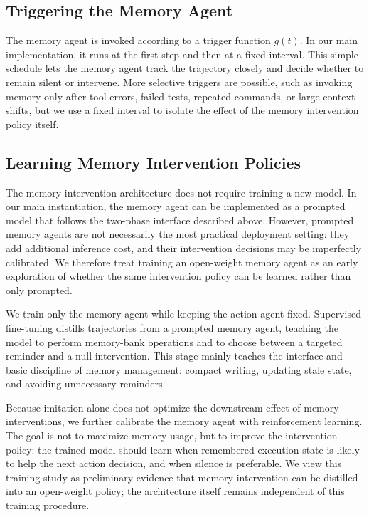 \subsection{Triggering the Memory Agent}

The memory agent is invoked according to a trigger function $g(t)$. In our main
implementation, it runs at the first step and then at a fixed interval. This
simple schedule lets the memory agent track the trajectory closely and decide
whether to remain silent or intervene. More selective triggers are possible, such
as invoking memory only after tool errors, failed tests, repeated commands, or
large context shifts, but we use a fixed interval to isolate the effect of the
memory intervention policy itself.


\subsection{Learning Memory Intervention Policies}
The memory-intervention architecture does not require training a new model. In
our main instantiation, the memory agent can be implemented as a prompted model
that follows the two-phase interface described above. However, prompted memory
agents are not necessarily the most practical deployment setting: they add
additional inference cost, and their intervention decisions may be imperfectly
calibrated. We therefore treat training an open-weight memory agent as an early
exploration of whether the same intervention policy can be learned rather than
only prompted.

We train only the memory agent while keeping the action agent fixed. Supervised
fine-tuning distills trajectories from a prompted memory agent, teaching the
model to perform memory-bank operations and to choose between a targeted reminder
and a null intervention. This stage mainly teaches the interface and basic
discipline of memory management: compact writing, updating stale state, and
avoiding unnecessary reminders.

Because imitation alone does not optimize the downstream effect of memory
interventions, we further calibrate the memory agent with reinforcement learning.
The goal is not to maximize memory usage, but to improve the intervention policy:
the trained model should learn when remembered execution state is likely to help
the next action decision, and when silence is preferable. We view this training
study as preliminary evidence that memory intervention can be distilled into an
open-weight policy; the architecture itself remains independent of this training
procedure.

